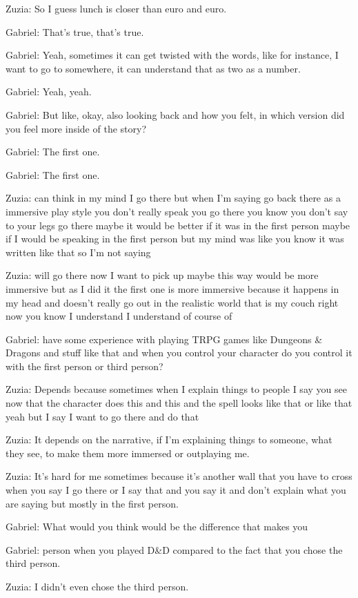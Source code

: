 Zuzia: So I guess lunch is closer than euro and euro.

Gabriel: That's true, that's true.

Gabriel: Yeah, sometimes it can get twisted with the words, like for instance, I want to go to somewhere, it can understand that as two as a number.

Gabriel: Yeah, yeah.

Gabriel: But like, okay, also looking back and how you felt, in which version did you feel more inside of the story?

Gabriel: The first one.

Gabriel: The first one.

Zuzia: can think in my mind I go there but when I'm saying go back there as a immersive play style you don't really speak you go there you know you don't say to your legs go there maybe it would be better if it was in the first person maybe if I would be speaking in the first person but my mind was like you know it was written like that so I'm not saying

Zuzia: will go there now I want to pick up maybe this way would be more immersive but as I did it the first one is more immersive because it happens in my head and doesn't really go out in the realistic world that is my couch right now you know I understand I understand of course of

Gabriel: have some experience with playing TRPG games like Dungeons \& Dragons and stuff like that and when you control your character do you control it with the first person or third person?

Zuzia: Depends because sometimes when I explain things to people I say you see now that the character does this and this and the spell looks like that or like that yeah but I say I want to go there and do that

Zuzia: It depends on the narrative, if I'm explaining things to someone, what they see, to make them more immersed or outplaying me.

Zuzia: It's hard for me sometimes because it's another wall that you have to cross when you say I go there or I say that and you say it and don't explain what you are saying but mostly in the first person.

Gabriel: What would you think would be the difference that makes you

Gabriel: person when you played D\&D compared to the fact that you chose the third person.

Zuzia: I didn't even chose the third person.

